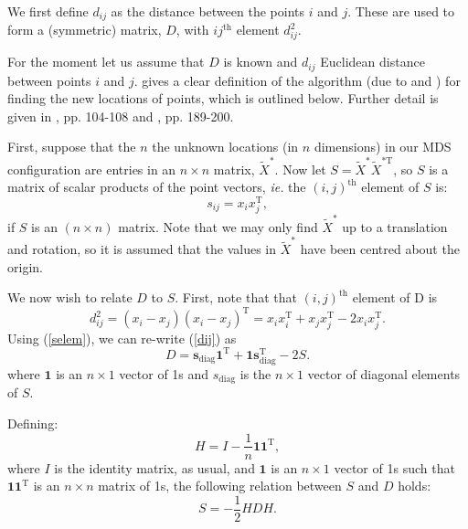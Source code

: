 \documentclass[a4paper,10pt]{article}
\newcommand{\eqn}[1]{(\ref{#1})}
\newcommand{\tr}[1]{#1^{\text{T}}}
\newcommand{\cross}{\times}
\begin{document}
We first define $d_{ij}$ as the distance between the points $i$ and $j$. These are used to form a (symmetric) matrix, $D$, with $ij^{\text{th}}$ element $d^2_{ij}$.

 
 
For the moment let us assume that $D$ is known and $d_{ij}$ Euclidean distance between points $i$ and $j$. \cite{diaconis08} gives a clear definition of the algorithm (due to \cite{schoenberg35} and \cite{torgerson}) for finding the new locations of points, which is outlined below. Further detail is given in \cite{principlesofMA}, pp. 104-108 and \cite{chatfieldcollins}, pp. 189-200.

First, suppose that the $n$ the unknown locations (in $n$ dimensions) in our MDS configuration are entries in an $n \times n$ matrix, $\tilde{X}^*$. Now let $S=\tilde{X}^{*} \tilde{X}^{*\text{T}} $, so $S$ is a matrix of scalar products of the point vectors, \emph{ie.} the $(i,j)^\text{th}$ element of $S$ is:
\begin{equation}
s_{ij} = x_i\tr{x_j},
\label{selem}
\end{equation}
if $S$ is an $(n\cross n)$ matrix. Note that we may only find $\tilde{X}^*$ up to a translation and rotation, so it is assumed that the values in $\tilde{X}^*$ have been centred about the origin.

We now wish to relate $D$ to $S$. First, note that that $(i,j)^\text{th}$ element of D is 
\begin{equation}
d_{ij}^2 = (x_i-x_j)\tr{(x_i-x_j)} = x_i\tr{x_i} + x_j\tr{x_j}  -2 x_i\tr{x_j}.
\label{dij}
\end{equation}
Using \eqn{selem}, we can re-write \eqn{dij} as
\begin{equation}
D=\mathbf{s}_\text{diag}\tr{\mathbf{1}} + \mathbf{1}\tr{\mathbf{s}_\text{diag}} -2S.
\label{dijmat}
\end{equation}
where $\mathbf{1}$ is an $n \cross 1$ vector of 1s and $s_\text{diag}$ is the $n \cross 1$ vector of diagonal elements of $S$.


Defining:
\begin{equation}
H = I-\frac{1}{n}\mathbf{1}\tr{\mathbf{1}},
\end{equation}
where $I$ is the identity matrix, as usual, and $\mathbf{1}$ is an $n \cross 1$ vector of 1s such that $\mathbf{1}\tr{\mathbf{1}}$ is an $n \cross n$ matrix of 1s, the following relation between $S$ and $D$ holds:
\begin{equation}
S = -\frac{1}{2}HDH.
\label{eqH}
\end{equation}
\end{document}
